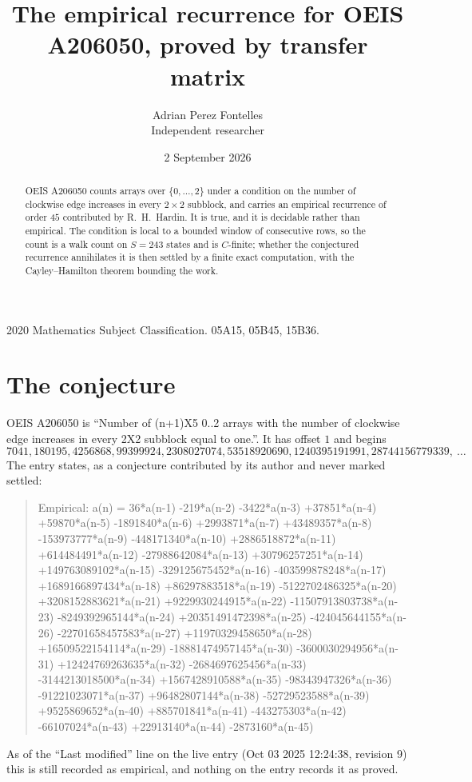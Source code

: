 \documentclass[11pt,a4paper]{article}
\title{The empirical recurrence for OEIS A206050, proved by transfer matrix}
\author{Adrian Perez Fontelles\\ \small Independent researcher}
\date{2 September 2026}
\theoremstyle{plain}
\theoremstyle{definition}
\begin{document}
\maketitle

\begin{abstract}
OEIS A206050 counts arrays over $\{0,\dots,2\}$ under a condition on the number of clockwise edge increases
in every $2\times2$ subblock, and carries an empirical recurrence of order $45$ contributed by
R.~H.~Hardin. It is true, and it is decidable rather than empirical. The condition is local to
a bounded window of consecutive rows, so the count is a walk count on $S=243$ states and is
$C$-finite; whether the conjectured recurrence annihilates it is then settled by a finite exact
computation, with the Cayley--Hamilton theorem bounding the work.
\end{abstract}

\noindent\small 2020 Mathematics Subject Classification. 05A15, 05B45, 15B36.\normalsize

\section{The conjecture}

OEIS A206050 is ``Number of (n+1)X5 0..2 arrays with the number of clockwise edge increases in every 2X2 subblock equal to one.''. It has offset $1$ and begins
\[
7041, 180195, 4256868, 99399924, 2308027074, 53518920690, 1240395191991, 28744156779339,\ \dots
\]
The entry states, as a conjecture contributed by its author and never marked settled:
\begin{quote}
Empirical: a(n) = 36*a(n-1) -219*a(n-2) -3422*a(n-3) +37851*a(n-4) +59870*a(n-5) -1891840*a(n-6) +2993871*a(n-7) +43489357*a(n-8) -153973777*a(n-9) -448171340*a(n-10) +2886518872*a(n-11) +614484491*a(n-12) -27988642084*a(n-13) +30796257251*a(n-14) +149763089102*a(n-15) -329125675452*a(n-16) -403599878248*a(n-17) +1689166897434*a(n-18) +86297883518*a(n-19) -5122702486325*a(n-20) +3208152883621*a(n-21) +9229930244915*a(n-22) -11507913803738*a(n-23) -8249392965144*a(n-24) +20351491472398*a(n-25) -424045644155*a(n-26) -22701658457583*a(n-27) +11970329458650*a(n-28) +16509522154114*a(n-29) -18881474957145*a(n-30) -3600030294956*a(n-31) +12424769263635*a(n-32) -2684697625456*a(n-33) -3144213018500*a(n-34) +1567428910588*a(n-35) -98343947326*a(n-36) -91221023071*a(n-37) +96482807144*a(n-38) -52729523588*a(n-39) +9525869652*a(n-40) +885701841*a(n-41) -443275303*a(n-42) -66107024*a(n-43) +22913140*a(n-44) -2873160*a(n-45)
\end{quote}
As of the ``Last modified'' line on the live entry (Oct 03 2025 12:24:38, revision 9) this is still
recorded as empirical, and nothing on the entry records it as proved.
\end{document}
